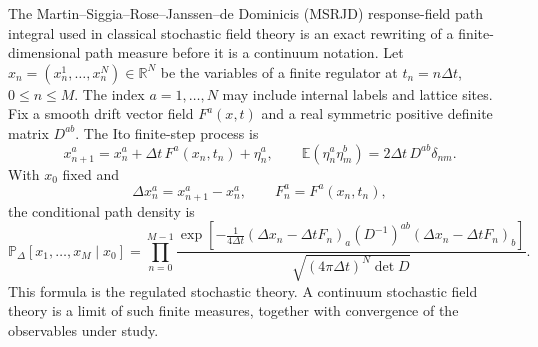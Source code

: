 The Martin--Siggia--Rose--Janssen--de Dominicis (MSRJD) response-field path
integral used in classical stochastic field theory is an exact rewriting of
a finite-dimensional path measure before it is a continuum notation.  Let
\(x_n=(x_n^1,\ldots,x_n^N)\in\mathbb R^N\) be the variables of a finite
regulator at \(t_n=n\Delta t\), \(0\le n\le M\).  The index
\(a=1,\ldots,N\) may include internal labels and lattice sites.  Fix a smooth
drift vector field \(F^a(x,t)\) and a real symmetric positive definite matrix
\(D^{ab}\).  The Ito finite-step process is
\begin{equation}
  x_{n+1}^a
  =
  x_n^a+\Delta t\,F^a(x_n,t_n)+\eta_n^a,
  \qquad
  \mathbb E(\eta_n^a\eta_m^b)
  =
  2\Delta t\,D^{ab}\delta_{nm}.
  \label{eq:finite-langevin-ito-step}
\end{equation}
With \(x_0\) fixed and
\[
  \Delta x_n^a=x_{n+1}^a-x_n^a,
  \qquad
  F_n^a=F^a(x_n,t_n),
\]
the conditional path density is
\begin{equation}
  \mathbb P_\Delta[x_1,\ldots,x_M\mid x_0]
  =
  \prod_{n=0}^{M-1}
  \frac{
    \exp\!\left[
      -\frac{1}{4\Delta t}
      (\Delta x_n-\Delta t F_n)_a(D^{-1})^{ab}
      (\Delta x_n-\Delta t F_n)_b
    \right]}
    {\sqrt{(4\pi\Delta t)^N\det D}} .
  \label{eq:finite-langevin-path-density}
\end{equation}
This formula is the regulated stochastic theory.  A continuum stochastic
field theory is a limit of such finite measures, together with convergence
of the observables under study.

